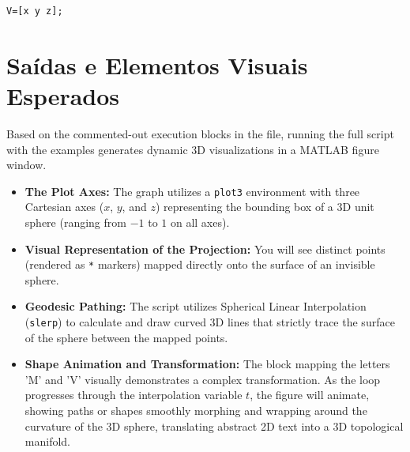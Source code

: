 \begin{lstlisting}[style=matlabstyle]
V=[x y z];
\end{lstlisting}

\section{Saídas e Elementos Visuais Esperados}

Based on the commented-out execution blocks in the file, running the full script with the examples generates dynamic 3D visualizations in a MATLAB figure window. 

\begin{itemize}
    \item \textbf{The Plot Axes:} The graph utilizes a \texttt{plot3} environment with three Cartesian axes ($x$, $y$, and $z$) representing the bounding box of a 3D unit sphere (ranging from $-1$ to $1$ on all axes).
    \item \textbf{Visual Representation of the Projection:} You will see distinct points (rendered as \texttt{*} markers) mapped directly onto the surface of an invisible sphere. 
    \item \textbf{Geodesic Pathing:} The script utilizes Spherical Linear Interpolation (\texttt{slerp}) to calculate and draw curved 3D lines that strictly trace the surface of the sphere between the mapped points.
    \item \textbf{Shape Animation and Transformation:} The block mapping the letters 'M' and 'V' visually demonstrates a complex transformation. As the loop progresses through the interpolation variable $t$, the figure will animate, showing paths or shapes smoothly morphing and wrapping around the curvature of the 3D sphere, translating abstract 2D text into a 3D topological manifold.
\end{itemize}
